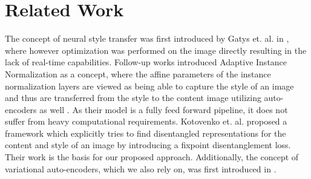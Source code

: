 \documentclass[twoside,twocolumn]{article}
\begin{document}
\section{Related Work}

The concept of neural style transfer was first introduced by Gatys et. al. in \cite{gatys}, where however optimization was performed on the image directly resulting in the lack of real-time capabilities. Follow-up works introduced Adaptive Instance Normalization as a concept, where the affine parameters of the instance normalization layers are viewed as being able to capture the style of an image and thus are transferred from the style to the content image utilizing auto-encoders as well \cite{adain}. As their model is a fully feed forward pipeline, it does not suffer from heavy computational requirements. Kotovenko et. al. proposed a framework which explicitly tries to find disentangled representations for the content and style of an image by introducing a fixpoint disentanglement loss. Their work \cite{Kotovenko_2019_ICCV} is the basis for our proposed approach. Additionally, the concept of variational auto-encoders, which we also rely on, was first introduced in \cite{vae}.

\printbibliography
\end{document}
